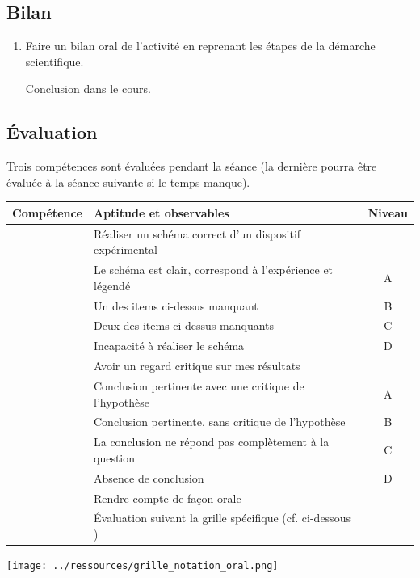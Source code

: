\documentclass[12pt,a4paper,fleqn]{article}
\begin{document}
\subsection*{Bilan}

\begin{enumerate}
\item[] \com{}

Faire un bilan oral de l'activité en reprenant les étapes de la démarche scientifique.

Conclusion dans le cours.
\end{enumerate}

\subsection*{Évaluation}

Trois compétences sont évaluées pendant la séance (la dernière pourra être évaluée à la séance suivante si le temps manque).

\begin{center}
\begin{tabular}{l|l|c}
\textbf{Compétence} & \textbf{Aptitude et observables} & \textbf{Niveau} \\
\hline \hline
\rea{}	& Réaliser un schéma correct d’un dispositif expérimental		& \\
			& Le schéma est clair, correspond à l'expérience et légendé 	& A \\
			& Un des items ci-dessus manquant											& B \\
			& Deux des items ci-dessus manquants										& C \\
			& Incapacité à réaliser le schéma													& D \\
\hline
\val{}	& Avoir un regard critique sur mes résultats								& \\
			& Conclusion pertinente avec une critique de l'hypothèse 		& A \\
			& Conclusion pertinente, sans critique de l'hypothèse				& B \\
			& La conclusion ne répond pas complètement à la question	& C \\
			& Absence de conclusion																& D \\
\hline
\com{}	& Rendre compte de façon orale													& \\
			& Évaluation suivant la grille spécifique (cf. ci-dessous	)			&
\end{tabular}
\vfill
\texttt{[image: ../ressources/grille\_notation\_oral.png]}
\end{center}
\end{document}

